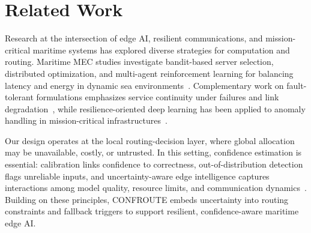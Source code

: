\documentclass[10pt, conference]{IEEEtran}
\begin{document}


\section{Related Work}
Research at the intersection of edge AI, resilient communications, and mission-critical maritime systems has explored diverse strategies for computation and routing. Maritime MEC studies investigate bandit-based server selection, distributed optimization, and multi-agent reinforcement learning for balancing latency and energy in dynamic sea environments~\cite{yang2022mab_maritime, you2025joint_maritime, vaidheeswaran2025}. Complementary work on fault-tolerant formulations emphasizes service continuity under failures and link degradation~\cite{zhang2024fault_tolerant_edge}, while resilience-oriented deep learning has been applied to anomaly handling in mission-critical infrastructures~\cite{ICAIIC2026}.

Our design operates at the local routing-decision layer, where global allocation may be unavailable, costly, or untrusted. In this setting, confidence estimation is essential: calibration links confidence to correctness, out-of-distribution detection flags unreliable inputs, and uncertainty-aware edge intelligence captures interactions among model quality, resource limits, and communication dynamics~\cite{zhang2022edgeuncertainty, Uncertainty}. Building on these principles, CONFROUTE embeds uncertainty into routing constraints and fallback triggers to support resilient, confidence-aware maritime edge AI.
\end{document}

